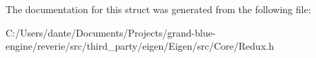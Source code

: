 The documentation for this struct was generated from the following file\+:\begin{DoxyCompactItemize}
\item 
C\+:/\+Users/dante/\+Documents/\+Projects/grand-\/blue-\/engine/reverie/src/third\+\_\+party/eigen/\+Eigen/src/\+Core/Redux.\+h\end{DoxyCompactItemize}

